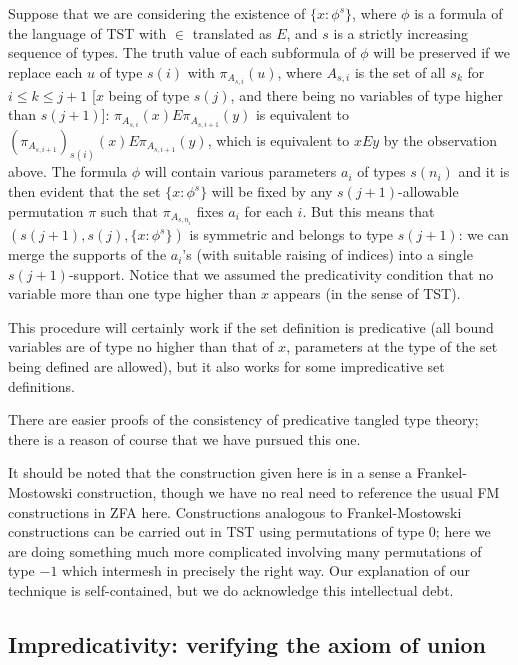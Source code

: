 \documentclass[112pt]{article}
\begin{document}
Suppose that we are considering the existence of $\{x : \phi^s\}$, where $\phi$ is a formula of the language of TST with $\in$ translated as $E$, and $s$ is a strictly increasing sequence of types.  The truth value of each subformula of $\phi$ will be preserved if we replace each $u$ of type $s(i)$ with $\pi_{A_{s,i}}(u)$, where  $A_{s,i}$ is the set of all $s_k$ for $i \leq k \leq j+1$ [$x$ being of type $s(j)$, and there being no variables of type higher than $s(j+1)$]:  $\pi_{A_{s,i}}(x) E  \pi_{A_{s,i+1}}(y)$ is equivalent to $(\pi_{A_{s,i+1}})_{s(i)}(x) E \pi_{A_{s,i+1}}(y)$, which is equivalent to $xEy$ by the observation above. The formula $\phi$ will contain various parameters $a_i$ of types $s(n_i)$ and it is then evident that the set $\{x : \phi^s\}$ will be fixed by any $s(j+1)$-allowable permutation $\pi$ such that $\pi_{A_{s,n_i}}$ fixes $a_i$ for each $i$.  But this means that
$(s(j+1),s(j),\{x : \phi^s\})$ is symmetric and belongs to type $s(j+1)$:  we can merge the supports of the $a_i$'s (with suitable raising of indices) into a single $s(j+1)$-support.  Notice that we assumed the predicativity condition that no variable more than one type higher than $x$ appears (in the sense of TST).

This procedure will certainly work if the set definition is predicative (all bound variables are of type no higher than that of $x$, parameters at the type
of the set being defined are allowed), but it also works for some impredicative set definitions.

There are easier proofs of the consistency of predicative tangled type theory;  there is a reason of course that we have pursued this one.

It should be noted that the construction given here is in a sense a Frankel-Mostowski construction, though we have no real need to reference the usual
FM constructions in ZFA here.  Constructions analogous to Frankel-Mostowski constructions can be carried out in TST using permutations of type 0;  here we are doing something much more complicated involving many permutations of type $-1$ which intermesh in precisely the right way.  Our explanation of our technique is self-contained, but we do acknowledge this intellectual debt.



\newpage
\subsection{Impredicativity:  verifying the axiom of union}
\end{document}
